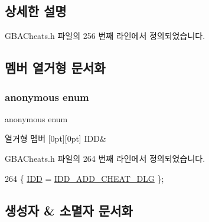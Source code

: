 \subsection{상세한 설명}


G\+B\+A\+Cheats.\+h 파일의 256 번째 라인에서 정의되었습니다.



\subsection{멤버 열거형 문서화}
\mbox{\label{class_add_cheat_code_a360bc0f5ed2a9d0598c246993ecb57c2}} 
\subsubsection{\texorpdfstring{anonymous enum}{anonymous enum}}
{\footnotesize\ttfamily anonymous enum}

\begin{DoxyEnumFields}{열거형 멤버}
[0pt][0pt]{}\mbox{\label{class_add_cheat_code_a360bc0f5ed2a9d0598c246993ecb57c2a7065caea1931a69dc54b0161b9295ba9}} 
I\+DD&\\
\hline

\end{DoxyEnumFields}


G\+B\+A\+Cheats.\+h 파일의 264 번째 라인에서 정의되었습니다.


\begin{DoxyCode}
264 \{ \mbox{\hyperlink{class_add_cheat_code_a360bc0f5ed2a9d0598c246993ecb57c2a7065caea1931a69dc54b0161b9295ba9}{IDD}} = \mbox{\hyperlink{resource_8h_a388a8d7b6dea32798ece69044a21790d}{IDD\_ADD\_CHEAT\_DLG}} \};
\end{DoxyCode}


\subsection{생성자 \& 소멸자 문서화}
\mbox{\label{class_add_cheat_code_a6904f72f50b5354c479d73ea19dba1ab}} 
